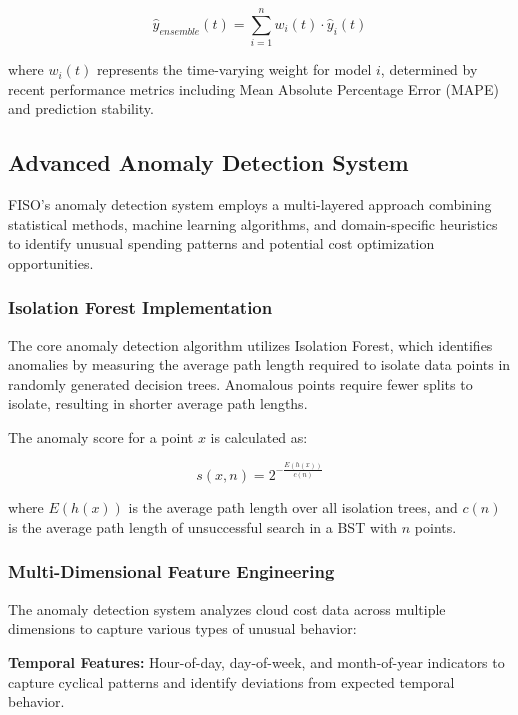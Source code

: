 \documentclass[conference]{IEEEtran}
\begin{document}
\begin{equation}
\hat{y}_{ensemble}(t) = \sum_{i=1}^{n} w_i(t) \cdot \hat{y}_i(t)
\end{equation}

where $w_i(t)$ represents the time-varying weight for model $i$, determined by recent performance metrics including Mean Absolute Percentage Error (MAPE) and prediction stability.

\subsection{Advanced Anomaly Detection System}

FISO's anomaly detection system employs a multi-layered approach combining statistical methods, machine learning algorithms, and domain-specific heuristics to identify unusual spending patterns and potential cost optimization opportunities.

\subsubsection{Isolation Forest Implementation}

The core anomaly detection algorithm utilizes Isolation Forest, which identifies anomalies by measuring the average path length required to isolate data points in randomly generated decision trees. Anomalous points require fewer splits to isolate, resulting in shorter average path lengths.

The anomaly score for a point $x$ is calculated as:

\begin{equation}
s(x,n) = 2^{-\frac{E(h(x))}{c(n)}}
\end{equation}

where $E(h(x))$ is the average path length over all isolation trees, and $c(n)$ is the average path length of unsuccessful search in a BST with $n$ points.

\subsubsection{Multi-Dimensional Feature Engineering}

The anomaly detection system analyzes cloud cost data across multiple dimensions to capture various types of unusual behavior:

\textbf{Temporal Features:} Hour-of-day, day-of-week, and month-of-year indicators to capture cyclical patterns and identify deviations from expected temporal behavior.
\end{document}

